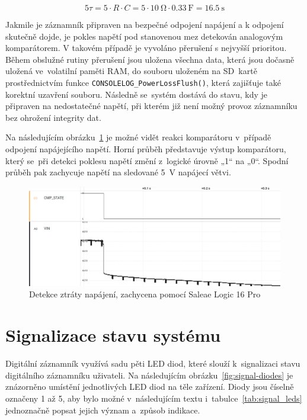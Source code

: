 \[
    5\tau = 5 \cdot R \cdot C = 5 \cdot \SI{10}{\ohm} \cdot \SI{0.33}{\farad} = \SI{16.5}{\second}
\]

Jakmile je záznamník připraven na bezpečné odpojení napájení a k odpojení skutečně dojde, je pokles napětí pod stanovenou mez detekován analogovým komparátorem. V takovém případě je vyvoláno přerušení s nejvyšší prioritou. Během obslužné rutiny přerušení jsou uložena všechna data, která jsou dočasně uložená ve~volatilní paměti RAM, do souboru uloženém na SD~kartě prostřednictvím funkce \texttt{CONSOLELOG\_PowerLossFlush()}, která zajišťuje také korektní uzavření souboru. Následně se~systém dostává do stavu, kdy je připraven na nedostatečné napětí, při kterém již není možný provoz záznamníku bez ohrožení integrity dat.

Na následujícím obrázku~\ref{fig:pwrloss-detection-saleae} je možné vidět reakci komparátoru v~případě odpojení napájejícího napětí.  Horní průběh představuje výstup komparátoru, který se~při detekci poklesu napětí změní z~logické úrovně „1“ na „0“. Spodní průběh pak zachycuje napětí na sledované \SI{5}{\volt} napájecí větvi.

\begin{figure}[h]
    \centering
    \includegraphics[width=1.00\textwidth]{obrazky-figures/saleae-power-loss-det.png}
    
    \caption{Detekce ztráty napájení, zachycena pomocí Saleae Logic 16 Pro}
    \label{fig:pwrloss-detection-saleae}
\end{figure}

\newpage

\section{Signalizace stavu systému}
\label{signalizace_stavu_systemu}
Digitální záznamník využívá sadu pěti LED diod, které slouží k~signalizaci stavu digitálního záznamníku uživateli. Na následujícím obrázku~\ref{fig:signal-diodes} je znázorněno umístění jednotlivých LED diod na těle zařízení. Diody jsou číselně označeny 1 až 5, aby bylo možné v~následujícím textu i~tabulce~\ref{tab:signal_leds} jednoznačně popsat jejich význam a~způsob indikace.

